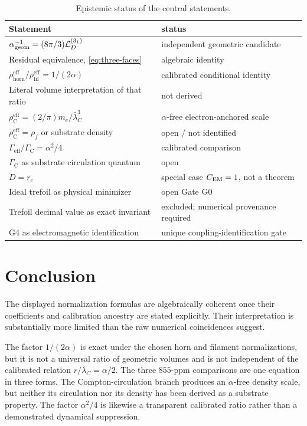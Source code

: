 \documentclass[aps,pre,preprint,notitlepage,nofootinbib,superscriptaddress]{revtex4-2}
\newcommand{\lC}{\bar\lambda_C}
\newcommand{\re}{r_e}
\newcommand{\calL}{\mathcal L}
\newcommand{\rhohorn}{\rho_{\mathrm{horn}}^{\mathrm{eff}}}
\newcommand{\rhofil}{\rho_{\mathrm{fil}}^{\mathrm{eff}}}
\newcommand{\rhoCeff}{\rho_{\mathrm C}^{\mathrm{eff}}}
\newcommand{\Gammaeff}{\Gamma_{\mathrm{eff}}}
\newcommand{\GammaC}{\Gamma_{\mathrm C}}
\begin{document}
\begin{table}[t]
\caption{Epistemic status of the central statements.}
\label{tab:status}
\begin{ruledtabular}
\begin{tabular}{ll}
Statement & status\\
\hline
\(\alpha_{\rm geom}^{-1}=(8\pi/3)\calL_D^{(3_1)}\) & independent geometric candidate\\
Residual equivalence, \cref{eq:three-faces} & algebraic identity\\
\(\rhohorn/\rhofil=1/(2\alpha)\) & calibrated conditional identity\\
Literal volume interpretation of that ratio & not derived\\
\(\rhoCeff=(2/\pi)m_e/\lC^3\) & \(\alpha\)-free electron-anchored scale\\
\(\rhoCeff=\rho_{\!f}\) or substrate density & open / not identified\\
\(\Gammaeff/\GammaC=\alpha^2/4\) & calibrated comparison\\
\(\GammaC\) as substrate circulation quantum & open\\
\(D=\re\) & special case \(C_{\rm EM}=1\), not a theorem\\
Ideal trefoil as physical minimizer & open Gate G0\\
Trefoil decimal value as exact invariant & excluded; numerical provenance required\\
G4 as electromagnetic identification & unique coupling-identification gate\\
\end{tabular}
\end{ruledtabular}
\end{table}

\section{Conclusion}
\label{sec:conclusion}

The displayed normalization formulas are algebraically coherent once their coefficients and calibration ancestry are stated explicitly.  Their interpretation is substantially more limited than the raw numerical coincidences suggest.

The factor \(1/(2\alpha)\) is exact under the chosen horn and filament normalizations, but it is not a universal ratio of geometric volumes and is not independent of the calibrated relation \(r/\lC=\alpha/2\).  The three \(855\)-ppm comparisons are one equation in three forms.  The Compton-circulation branch produces an \(\alpha\)-free density scale, but neither its circulation nor its density has been derived as a substrate property.  The factor \(\alpha^2/4\) is likewise a transparent calibrated ratio rather than a demonstrated dynamical suppression.
\end{document}

